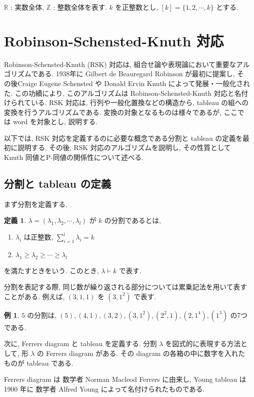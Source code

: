 \documentclass[
  a4paper, 
  12pt,
  ja=standard,
  xelatex,
  left=30truemm,
  right=30truemm,
  titlepage 
]{bxjsarticle}
\theoremstyle{definition}
\newtheorem{df}{定義}[section]
\newtheorem*{ex}{例}
\begin{document}
$\mathbb{R}$ : 実数全体, $\mathbb{Z}$ : 整数全体を表す.
$k$ を正整数とし, $[k] = \{ 1, 2, \cdots, k \}$ とする.

\section{Robinson-Schensted-Knuth 対応}
Robinson-Schensted-Knuth (RSK) 対応は, 組合せ論や表現論において重要なアルゴリズムである.
1938年に Gilbert de Beauregard Robinson が最初に提案し, 
その後Craige Eugene Schensted や Donald Ervin Knuth によって発展・一般化された.
この功績により, このアルゴリズムは Robinson-Schensted-Knuth 対応と名付けられている.
RSK 対応は, 行列や一般化置換などの構造から, tableau の組への変換を行うアルゴリズムである.
変換の対象となるものは様々であるが, ここでは word を対象とし, 説明する.

以下では, RSK 対応を定義するのに必要な概念である分割と tableau の定義を最初に説明する.
その後, RSK 対応のアルゴリズムを説明し, その性質として Knuth 同値とP-同値の関係性について述べる.

\subsection{分割と tableau の定義}
まず分割を定義する.
\begin{df}
  $\lambda = (\lambda_1, \lambda_2, \cdots, \lambda_l)$ が $k$ の分割であるとは,
  \begin{enumerate}
    \item $\lambda_i$ は正整数, $\sum_{i=1}^l \lambda_i=k$
    \item $\lambda_1\geq \lambda_2  \geq \cdots \geq  \lambda_l$ 
  \end{enumerate}
  を満たすときをいう. 
  このとき,  $\lambda \vdash k$ で表す.
\end{df}

分割を表記する際, 同じ数が繰り返される部分については累乗記法を用いて表すことがある.
例えば, $(3, 1, 1)$ を $(3, 1^2)$ で表す.

\begin{ex}
  $5$ の分割は, $(5), (4, 1), (3, 2), (3, 1^2), (2^2, 1), (2, 1^4), (1^5)$ の7つである.
\end{ex}

次に, Ferrers diagram と tableau を定義する.
分割 $\lambda$ を図式的に表現する方法として, 形 $\lambda$ の Ferrers diagram がある.
その diagram の各箱の中に数字を入れたものが tableau である.

Ferrers diagram は 数学者 Norman Macleod Ferrers に由来し, 
Young tableau は 1900 年に 数学者 Alfred Young によって名付けられたものである.
\end{document}
